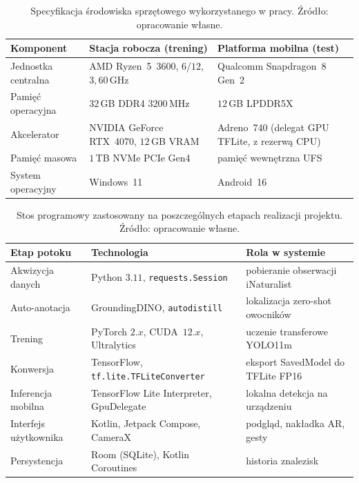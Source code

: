 \begin{table}[htbp]
 \centering
 \caption{Specyfikacja środowiska sprzętowego wykorzystanego w pracy. Źródło: opracowanie własne.}
 \label{tab:sprzet}
 \begin{tabular}{|p{3.4cm}|p{4.6cm}|p{4.6cm}|}
 \hline
 \textbf{Komponent} & \textbf{Stacja robocza (trening)} & \textbf{Platforma mobilna (test)} \\
 \hline \hline
 Jednostka centralna & AMD Ryzen~5~3600, $6$/$12$, $3{,}60$\,GHz & Qualcomm Snapdragon~8 Gen~2 \\
 \hline
 Pamięć operacyjna & $32$\,GB DDR4 $3200$\,MHz & $12$\,GB LPDDR5X \\
 \hline
 Akcelerator & NVIDIA GeForce RTX~4070, $12$\,GB VRAM & Adreno~740 (delegat GPU TFLite, z rezerwą CPU) \\
 \hline
 Pamięć masowa & $1$\,TB NVMe PCIe Gen4 & pamięć wewnętrzna UFS \\
 \hline
 System operacyjny & Windows~11 & Android~16 \\
 \hline
 \end{tabular}
\end{table}

\begin{table}[htbp]
 \centering
 \caption{Stos programowy zastosowany na poszczególnych etapach realizacji projektu. Źródło: opracowanie własne.}
 \label{tab:stos_programowy}
 \begin{tabular}{|p{3.3cm}|p{5.0cm}|p{4.3cm}|}
 \hline
 \textbf{Etap potoku} & \textbf{Technologia} & \textbf{Rola w systemie} \\
 \hline \hline
 Akwizycja danych & Python $3.11$, \texttt{requests.Session} & pobieranie obserwacji iNaturalist \\
 \hline
 Auto-anotacja & GroundingDINO, \texttt{autodistill} & lokalizacja zero-shot owocników \\
 \hline
 Trening & PyTorch $2.x$, CUDA~$12.x$, Ultralytics & uczenie transferowe YOLO11m \\
 \hline
 Konwersja & TensorFlow, \texttt{tf.lite.TFLiteConverter} & eksport SavedModel do TFLite FP16 \\
 \hline
 Inferencja mobilna & TensorFlow Lite Interpreter, GpuDelegate & lokalna detekcja na urządzeniu \\
 \hline
 Interfejs użytkownika & Kotlin, Jetpack Compose, CameraX & podgląd, nakładka AR, gesty \\
 \hline
 Persystencja & Room (SQLite), Kotlin Coroutines & historia znalezisk \\
 \hline
 \end{tabular}
\end{table}

